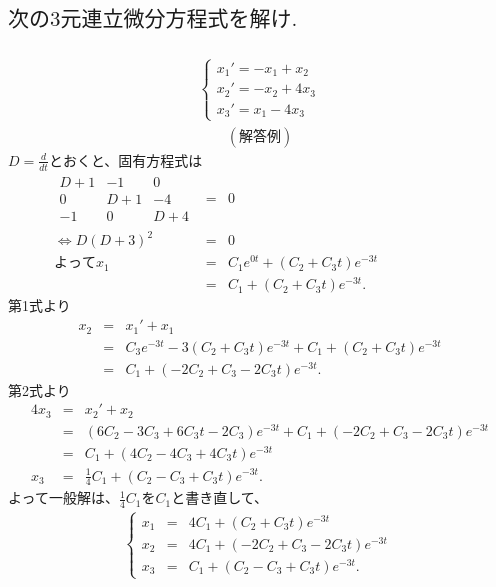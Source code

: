 \documentclass[a4paper,11pt,fleqn]{jarticle}
\begin{document}
\newpage
\subsection{$次の3元連立微分方程式を解け.$}
\subsubsection{}
\begin{eqnarray*}
\left\{ \begin{array}{l}
x_{1}'=-x_{1}+x_{2}  \\
x_{2}'=-x_{2}+4x_{3} \\
x_{3}'=x_{1}-4x_{3}  
\end{array}\right.
\end{eqnarray*}
\begin{eqnarray*}
(解答例)
\end{eqnarray*}
$D=\frac d{dt}$とおくと、固有方程式は
\begin{eqnarray*}
\begin{array}{|ccc|}
D+1 & -1 & 0 \\
0 & D+1 & -4 \\
-1 & 0 & D+4
\end{array}
&=& 0 \\
\Leftrightarrow D(D+3)^2 &=& 0 \\
よって  x_1 &=& C_1e^{0t}+(C_2+C_3t)e^{-3t} \\
&=& C_1+(C_2+C_3t)e^{-3t}. \hspace{3cm}
\end{eqnarray*}
第1式より
\begin{eqnarray*}
x_2 &=& x_1'+x_1 \\
&=& C_3e^{-3t}-3(C_2+C_3t)e^{-3t}+C_1+(C_2+C_3t)e^{-3t} \\
&=& C_1+(-2C_2+C_3-2C_3t)e^{-3t}.
\end{eqnarray*}
第2式より
\begin{eqnarray*}
4x_3 &=& x_2'+x_2 \\
&=& (6C_2-3C_3+6C_3t-2C_3)e^{-3t}+C_1+(-2C_2+C_3-2C_3t)e^{-3t} \\
&=& C_1+(4C_2-4C_3+4C_3t)e^{-3t} \\
x_3 &=& \frac14C_1+(C_2-C_3+C_3t)e^{-3t}.
\end{eqnarray*}
よって一般解は、$\frac14C_1$を$C_1$と書き直して、
\begin{eqnarray*}
\left\{ \begin{array}{rcl}
x_1&=&4C_1+(C_2+C_3t)e^{-3t} \\
x_2&=&4C_1+(-2C_2+C_3-2C_3t)e^{-3t} \ \\
x_3&=&C_1+(C_2-C_3+C_3t)e^{-3t}. \ 
\end{array}\right.
\end{eqnarray*}
\end{document}
